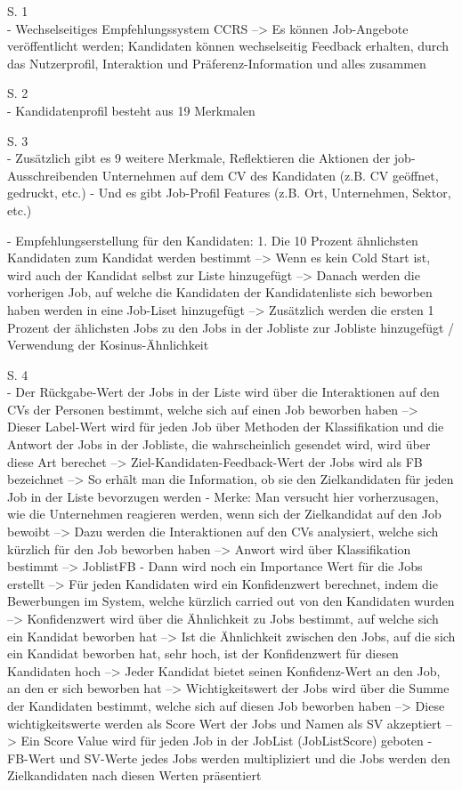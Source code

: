 S. 1\\
- Wechselseitiges Empfehlungssystem CCRS --> Es können Job-Angebote veröffentlicht werden; Kandidaten können wechselseitig Feedback erhalten, durch das Nutzerprofil, Interaktion und Präferenz-Information und alles zusammen

S. 2\\
- Kandidatenprofil besteht aus 19 Merkmalen

S. 3\\
- Zusätzlich gibt es 9 weitere Merkmale, Reflektieren die Aktionen der job-Ausschreibenden Unternehmen auf dem CV des Kandidaten (z.B. CV geöffnet, gedruckt, etc.)
- Und es gibt Job-Profil Features (z.B. Ort, Unternehmen, Sektor, etc.)

- Empfehlungserstellung für den Kandidaten: 1. Die 10 Prozent ähnlichsten Kandidaten zum Kandidat werden bestimmt --> Wenn es kein Cold Start ist, wird auch der Kandidat selbst zur Liste hinzugefügt --> Danach werden die vorherigen Job, auf welche die Kandidaten der Kandidatenliste sich beworben haben werden in eine Job-Liset hinzugefügt --> Zusätzlich werden die ersten 1 Prozent der ählichsten Jobs zu den Jobs in der Jobliste zur Jobliste hinzugefügt / Verwendung der Kosinus-Ähnlichkeit

S. 4\\
- Der Rückgabe-Wert der Jobs in der Liste wird über die Interaktionen auf den CVs der Personen bestimmt, welche sich auf einen Job beworben haben --> Dieser Label-Wert wird für jeden Job über Methoden der Klassifikation und die Antwort der Jobs in der Jobliste, die wahrscheinlich gesendet wird, wird über diese Art berechet --> Ziel-Kandidaten-Feedback-Wert der Jobs wird als FB bezeichnet --> So erhält man die Information, ob sie den Zielkandidaten für jeden Job in der Liste bevorzugen werden
- Merke: Man versucht hier vorherzusagen, wie die Unternehmen reagieren werden, wenn sich der Zielkandidat auf den Job bewoibt --> Dazu werden die Interaktionen auf den CVs analysiert, welche sich kürzlich für den Job beworben haben --> Anwort wird über Klassifikation bestimmt --> JoblistFB
- Dann wird noch ein Importance Wert für die Jobs erstellt --> Für jeden Kandidaten wird ein Konfidenzwert berechnet, indem die Bewerbungen im System, welche kürzlich carried out von den Kandidaten wurden --> Konfidenzwert wird über die Ähnlichkeit zu Jobs bestimmt, auf welche sich ein Kandidat beworben hat --> Ist die Ähnlichkeit zwischen den Jobs, auf die sich ein Kandidat beworben hat, sehr hoch, ist der Konfidenzwert für diesen Kandidaten hoch --> Jeder Kandidat bietet seinen Konfidenz-Wert an den Job, an den er sich beworben hat --> Wichtigkeitswert der Jobs wird über die Summe der Kandidaten bestimmt, welche sich auf diesen Job beworben haben --> Diese wichtigkeitswerte werden als Score Wert der Jobs und Namen als SV akzeptiert --> Ein Score Value wird für jeden Job in der JobList (JobListScore) geboten
- FB-Wert und SV-Werte jedes Jobs werden multipliziert und die Jobs werden den Zielkandidaten nach diesen Werten präsentiert

